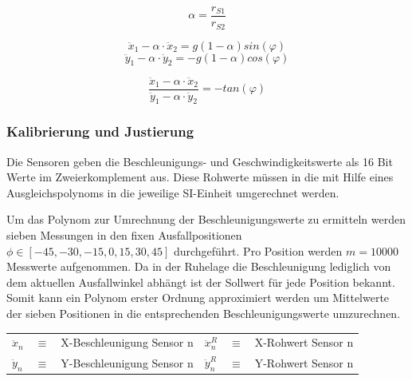 \begin{equation}
\alpha = \frac{r_{S1}}{r_{S2}}
\end{equation}

\begin{equation}
\ddot{x}_1 - \alpha \cdot \ddot{x}_2 = 
g(1 - \alpha)sin(\varphi)
\end{equation}
\begin{equation}
\ddot{y}_1 - \alpha \cdot \ddot{y}_2 = 
-g(1- \alpha)cos(\varphi)
\end{equation}

\begin{equation}
\frac{\ddot{x}_1 - \alpha \cdot \ddot{x}_2}{\ddot{y}_1 - \alpha \cdot \ddot{y}_2} = -tan(\varphi)
\end{equation}

\subsubsection{Kalibrierung und Justierung}
Die Sensoren geben die Beschleunigungs- und Geschwindigkeitswerte als 16 Bit Werte im Zweierkomplement aus. Diese Rohwerte müssen in die mit Hilfe eines Ausgleichspolynoms in die jeweilige SI-Einheit umgerechnet werden. 

Um das Polynom zur Umrechnung der Beschleunigungswerte zu ermitteln werden sieben Messungen in den fixen Ausfallpositionen $\phi \in [-45, -30, -15, 0, 15, 30, 45]$ durchgeführt. Pro Position werden $m = 10000$ Messwerte aufgenommen. Da in der Ruhelage die Beschleunigung lediglich von dem aktuellen Ausfallwinkel abhängt ist der Sollwert für jede Position bekannt. Somit kann ein Polynom erster Ordnung approximiert werden um Mittelwerte der sieben Positionen in die entsprechenden Beschleunigungswerte umzurechnen.

\begin{table}[h]
\centering
\begin{tabular}{lcllcl}
$\ddot{x}_n$ &$\equiv$& X-Beschleunigung Sensor n &
$\ddot{x}^R_n$ &$\equiv$& X-Rohwert Sensor n \\
$\ddot{y}_n$ &$\equiv$& Y-Beschleunigung Sensor n &
$\ddot{y}^R_n$ &$\equiv$& Y-Rohwert Sensor n
\end{tabular}
\end{table}

